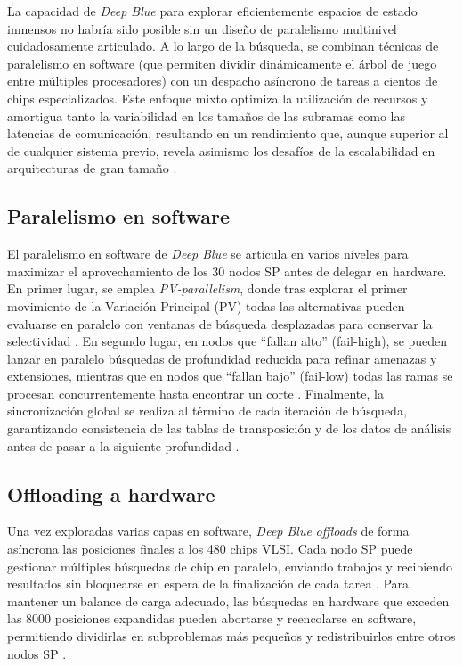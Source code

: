 \documentclass[a4paper, 12pt]{article}
\begin{document}
La capacidad de \textit{Deep Blue} para explorar eficientemente 
espacios de estado inmensos no habría sido posible sin un diseño 
de paralelismo multinivel cuidadosamente articulado. A lo largo 
de la búsqueda, se combinan técnicas de paralelismo en software 
(que permiten dividir dinámicamente el árbol de juego entre 
múltiples procesadores) con un despacho asíncrono de tareas a 
cientos de chips especializados. Este enfoque mixto optimiza la 
utilización de recursos y amortigua tanto la variabilidad en los 
tamaños de las subramas como las latencias de comunicación, 
resultando en un rendimiento que, aunque superior al de cualquier 
sistema previo, revela asimismo los desafíos de la escalabilidad 
en arquitecturas de gran tamaño \cite{campbell2002deep}. 


\subsection{Paralelismo en software}

El paralelismo en software de \textit{Deep Blue} se articula en 
varios niveles para maximizar el aprovechamiento de los 30 
nodos SP antes de delegar en hardware. En primer lugar, se 
emplea \emph{PV-parallelism}, donde tras explorar el primer 
movimiento de la Variación Principal (PV) todas las alternativas 
pueden evaluarse en paralelo con ventanas de búsqueda 
desplazadas para conservar la selectividad \cite{campbell2002deep}. 
En segundo lugar, en nodos que “fallan alto” (fail-high), se 
pueden lanzar en paralelo búsquedas de profundidad reducida 
para refinar amenazas y extensiones, mientras que en nodos que 
“fallan bajo” (fail-low) todas las ramas se procesan 
concurrentemente hasta encontrar un corte \cite{campbell2002deep}. 
Finalmente, la sincronización global se realiza al término de 
cada iteración de búsqueda, garantizando consistencia de las 
tablas de transposición y de los datos de análisis antes de 
pasar a la siguiente profundidad \cite{campbell2002deep}.

\subsection{Offloading a hardware}

Una vez exploradas varias capas en software, \textit{Deep Blue} 
\emph{offloads} de forma asíncrona las posiciones finales a los 
480 chips VLSI. Cada nodo SP puede gestionar múltiples búsquedas 
de chip en paralelo, enviando trabajos y recibiendo resultados 
sin bloquearse en espera de la finalización de cada tarea 
\cite{campbell2002deep}. Para mantener un balance de carga 
adecuado, las búsquedas en hardware que exceden las 8000 
posiciones expandidas pueden abortarse y reencolarse en 
software, permitiendo dividirlas en subproblemas más pequeños y 
redistribuirlos entre otros nodos SP \cite{campbell2002deep}.
\end{document}
